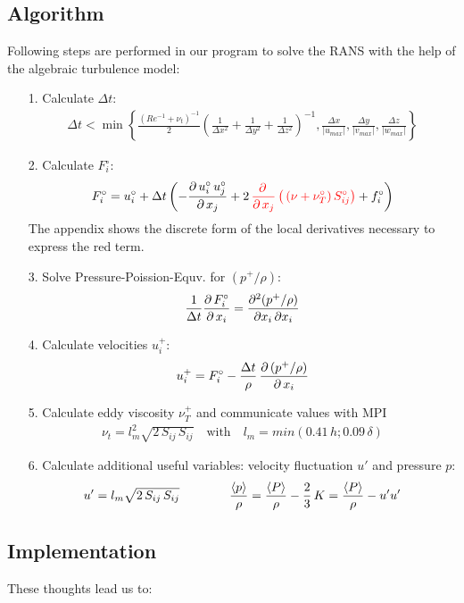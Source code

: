 \documentclass[11pt,a4paper]{article}
\begin{document}
\subsection{Algorithm}\label{sec:algorithm}
Following steps are performed in our program to solve the RANS with the help of the algebraic turbulence model:
\begin{itemize}
\item[1.] Calculate $\Delta t$:
\begin{align}
\Delta t < \min\left\lbrace
\frac{\left( Re^{-1}+\nu_t \right)^{-1}}{2}\left(
\frac{1}{\Delta x^2}+
\frac{1}{\Delta y^2}+
\frac{1}{\Delta z^2}
\right)^{-1}
,
\frac{\Delta x}{|u_{max}|},
\frac{\Delta y}{|v_{max}|},
\frac{\Delta z}{|w_{max}|}
\right\rbrace
\end{align}
\item[2.] Calculate $F_i^\circ$:
\begin{align}
F_i^\circ=u_i^\circ+\Delta t\left(-\frac{\partial \, u_i^\circ\,u_j^\circ}{\partial \, x_j} +2\,\textcolor{red}{\frac{\partial \, }{\partial \, x_j} \left( \,\left(\nu+\nu_T^\circ\right)S_{ij}^\circ\right)}+f_i^\circ  \right)
\end{align}
The appendix shows the discrete form of the local derivatives necessary to express the red term.
\item[3.] Solve Pressure-Poission-Equv. for $(p^+/\rho)$:
\begin{align}
\frac{1}{\Delta t} \frac{\partial \, F_i^\circ}{\partial \, x_i}  =
\frac{\partial^2 (p^+/\rho)}{\partial x_i\,\partial x_i}
\end{align}
\item[4.] Calculate velocities $u_i^+$:
\begin{align}
u_i^+
=F_i^\circ-\frac{\Delta t}{\rho}\,\frac{\partial \, (p^+/\rho)}{\partial \, x_i}
\end{align}
\item[5.] Calculate eddy viscosity $\nu_T^+$ and communicate values with MPI
\begin{align}
\nu_{t}=l_m^2\sqrt{2\,S_{ij}\,S_{ij}}\quad\text{with} \quad l_m=min(0.41\,h;0.09\,\delta)
\end{align}
\item[6.] Calculate additional useful variables: velocity fluctuation $u'$ and pressure $p$:
\begin{align}
u'=l_m\sqrt{2\,S_{ij}\,S_{ij}}\qquad\qquad
\frac{\left\langle p\right\rangle}{\rho}=\frac{\left\langle P\right\rangle}{\rho}-\frac{2}{3}\,K=\frac{\left\langle P\right\rangle}{\rho}-u'u'
\end{align}
\end{itemize}

\clearpage
\subsection{Implementation}
These thoughts lead us to:
\end{document}
